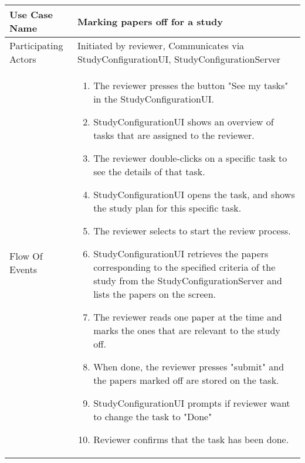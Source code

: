 \begin{center}
	\begin{tabular}{ | l | p{10cm} |} \hline
	    Use Case Name & \textbf{Marking papers off for a study}\\ \hline
	    Participating Actors &  Initiated by reviewer, Communicates via StudyConfigurationUI, StudyConfigurationServer\\ \hline
	    Flow Of Events &
	    \begin{enumerate}
		    \item The reviewer presses the button "See my tasks" in the StudyConfigurationUI.
		    \item StudyConfigurationUI shows an overview of tasks that are assigned to the reviewer.
		    \item The reviewer double-clicks on a specific task to see the details of that task.
		    \item StudyConfigurationUI opens the task, and shows the study plan for this specific task. 
		    \item The reviewer selects to start the review process.
		    \item StudyConfigurationUI retrieves the papers corresponding to the specified criteria of the study from the StudyConfigurationServer and lists the papers on the screen.
		    \item The reviewer reads one paper at the time and marks the ones that are relevant to the study off.
		    \item When done, the reviewer presses "submit" and the papers marked off are stored on the task.
		    \item StudyConfigurationUI prompts if reviewer want to change the task to "Done"
		    \item Reviewer confirms that the task has been done.
	     	    		    	    

\end{enumerate}
\end{tabular}
\end{center}
